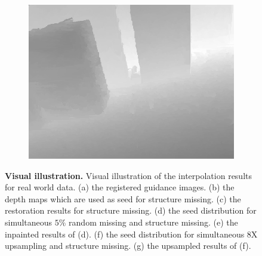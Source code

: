 \documentclass[preprint,10pt,5p,times,twocolumn]{elsarticle}
\begin{document}
\begin{figure}[t]
\begin{center}
\begin{subfigure}[b]{0.136\linewidth}
    \includegraphics[width=\linewidth]{case_upsampling_inpainting.png}
    \caption{}
    \label{fig:upsampling_inpainting}
\end{subfigure}
\end{center}
\caption{\textbf{Visual illustration.} Visual illustration of the interpolation results for real world data. (a) the registered guidance images. (b) the depth maps which are used as seed for structure missing. (c) the restoration results for structure missing. (d) the seed distribution for simultaneous $5\%$ random missing and structure missing. (e) the inpainted results of (d). (f) the seed distribution for simultaneous 8X upsampling and structure missing. (g) the upsampled results of (f).}
\label{fig:visual_illustration}
\end{figure}
\end{document}
